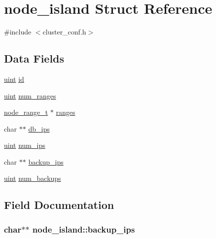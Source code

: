 \hypertarget{structnode__island}{}\section{node\+\_\+island Struct Reference}
\label{structnode__island}


{\ttfamily \#include $<$cluster\+\_\+conf.\+h$>$}

\subsection*{Data Fields}
\begin{DoxyCompactItemize}
\item 
\hyperlink{generic_8h_a91ad9478d81a7aaf2593e8d9c3d06a14}{uint} \hyperlink{structnode__island_a79866cf44d870e331f946f0c35a5480c}{id}
\item 
\hyperlink{generic_8h_a91ad9478d81a7aaf2593e8d9c3d06a14}{uint} \hyperlink{structnode__island_aa17b8f9306bc4042a8ae6945c888ac72}{num\+\_\+ranges}
\item 
\hyperlink{cluster__conf_8h_a1a626af99799b910746d0c23516856ff}{node\+\_\+range\+\_\+t} $\ast$ \hyperlink{structnode__island_a78eddc5a37f1f34add0f5cafba4deda5}{ranges}
\item 
char $\ast$$\ast$ \hyperlink{structnode__island_af613affd12632a3630c9d1121b5080ef}{db\+\_\+ips}
\item 
\hyperlink{generic_8h_a91ad9478d81a7aaf2593e8d9c3d06a14}{uint} \hyperlink{structnode__island_a839d2e2c082a465c3ed26b47e9b1a608}{num\+\_\+ips}
\item 
char $\ast$$\ast$ \hyperlink{structnode__island_a7e41dd64bf424c7b7c028bd98efe83ae}{backup\+\_\+ips}
\item 
\hyperlink{generic_8h_a91ad9478d81a7aaf2593e8d9c3d06a14}{uint} \hyperlink{structnode__island_aaf844766e5074a9ff5660aeab05e4f3f}{num\+\_\+backups}
\end{DoxyCompactItemize}


\subsection{Field Documentation}
\subsubsection[{\texorpdfstring{backup\+\_\+ips}{backup_ips}}]{\setlength{\rightskip}{0pt plus 5cm}char$\ast$$\ast$ node\+\_\+island\+::backup\+\_\+ips}\hypertarget{structnode__island_a7e41dd64bf424c7b7c028bd98efe83ae}{}\label{structnode__island_a7e41dd64bf424c7b7c028bd98efe83ae}
